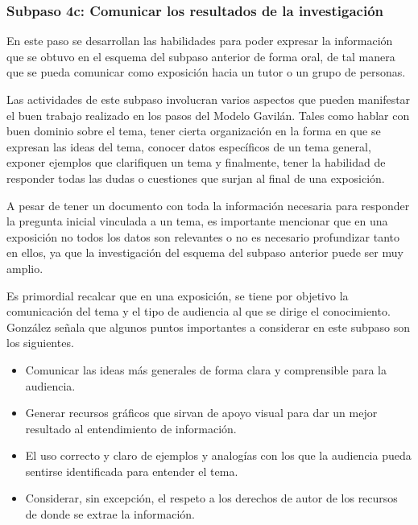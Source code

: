 
\subsubsection{Subpaso 4c: Comunicar los resultados de la investigación}
\label{secPaso4cCap2}

En este paso se desarrollan las habilidades para poder expresar la información que se obtuvo en el esquema del subpaso anterior de forma oral, de tal manera que se pueda comunicar como exposición hacia un tutor o un grupo de personas.

Las actividades de este subpaso involucran varios aspectos que pueden manifestar el buen trabajo realizado en los pasos del Modelo Gavilán. Tales como hablar con buen dominio sobre el tema, tener cierta organización en la forma en que se expresan las ideas del tema, conocer datos específicos de un tema general, exponer ejemplos que clarifiquen un tema y finalmente, tener la habilidad de responder todas las dudas o cuestiones que surjan al final de una exposición.

A pesar de tener un documento con toda la información necesaria para responder la pregunta inicial vinculada a un tema, es importante mencionar que en una exposición no todos los datos son relevantes o no es necesario profundizar tanto en ellos, ya que la investigación del esquema del subpaso anterior puede ser muy amplio.

Es primordial recalcar que en una exposición, se tiene por objetivo la comunicación del tema y el tipo de audiencia al que se dirige el conocimiento. González señala que algunos puntos importantes a considerar en este subpaso son los siguientes.

\begin{itemize}
  \item Comunicar las ideas más generales de forma clara y comprensible para la audiencia.
  \item Generar recursos gráficos que sirvan de apoyo visual para dar un mejor resultado al entendimiento de información.
  \item El uso correcto y claro de ejemplos y analogías con los que la audiencia pueda sentirse identificada para entender el tema.
  \item Considerar, sin excepción, el respeto a los derechos de autor de los recursos de donde se extrae la información.
\end{itemize}

